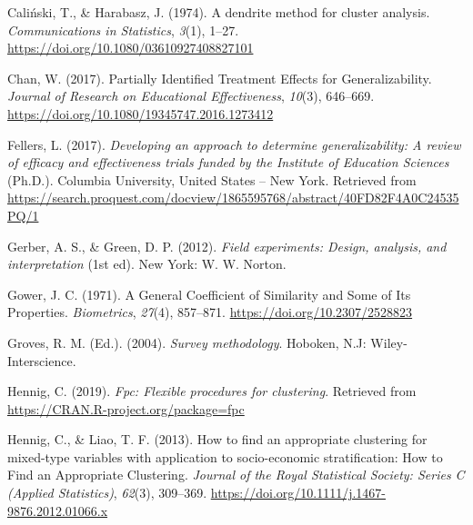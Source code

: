 \documentclass[
  english,
  man,floatsintext]{apa6}
\newlength{\cslhangindent}
\newlength{\cslentryspacingunit} %
\newenvironment{CSLReferences}[2] %
 {%
  \setlength{\parindent}{0pt}
  \ifodd #1
  \let\oldpar\par
  \def\par{\hangindent=\cslhangindent\oldpar}
  \fi
  \setlength{\parskip}{#2\cslentryspacingunit}
 }%
 {}
\begin{document}
\hypertarget{refs}{}
\begin{CSLReferences}{1}{0}
\leavevmode{}%
Caliński, T., \& Harabasz, J. (1974). A dendrite method for cluster analysis. \emph{Communications in Statistics}, \emph{3}(1), 1--27. \url{https://doi.org/10.1080/03610927408827101}

\leavevmode{}%
Chan, W. (2017). Partially {Identified} {Treatment} {Effects} for {Generalizability}. \emph{Journal of Research on Educational Effectiveness}, \emph{10}(3), 646--669. \url{https://doi.org/10.1080/19345747.2016.1273412}

\leavevmode{}%
Fellers, L. (2017). \emph{Developing an approach to determine generalizability: {A} review of efficacy and effectiveness trials funded by the {Institute} of {Education Sciences}} (Ph.D.). Columbia University, United States -- New York. Retrieved from \url{https://search.proquest.com/docview/1865595768/abstract/40FD82F4A0C24535PQ/1}

\leavevmode{}%
Gerber, A. S., \& Green, D. P. (2012). \emph{Field experiments: Design, analysis, and interpretation} (1st ed). New York: W. W. Norton.

\leavevmode{}%
Gower, J. C. (1971). A {General Coefficient} of {Similarity} and {Some} of {Its Properties}. \emph{Biometrics}, \emph{27}(4), 857--871. \url{https://doi.org/10.2307/2528823}

\leavevmode{}%
Groves, R. M. (Ed.). (2004). \emph{Survey methodology}. Hoboken, N.J: Wiley-Interscience.

\leavevmode{}%
Hennig, C. (2019). \emph{Fpc: Flexible procedures for clustering}. Retrieved from \url{https://CRAN.R-project.org/package=fpc}

\leavevmode{}%
Hennig, C., \& Liao, T. F. (2013). How to find an appropriate clustering for mixed-type variables with application to socio-economic stratification: {How} to {Find} an {Appropriate Clustering}. \emph{Journal of the Royal Statistical Society: Series C (Applied Statistics)}, \emph{62}(3), 309--369. \url{https://doi.org/10.1111/j.1467-9876.2012.01066.x}


\end{CSLReferences}
\end{document}
